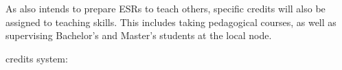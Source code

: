 \begin{center}
\begin{tabular}{|p{}|p{}|}
\end{tabular}
\end{center}
As \acronym also intends to prepare ESRs to teach others, specific credits will also be assigned to teaching skills. 
This includes taking pedagogical courses, as well as supervising Bachelor's and Master's students at the local node. 

\vskip2pt
\noindent \color{blue}\acronym credits system: \color{black}

